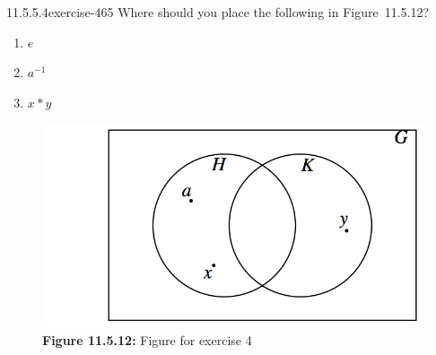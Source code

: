 \documentclass[twoside,10pt,]{book}
\numberwithin{equation}{section}
\begin{document}
\begin{divisionsolution}{11.5.5.4}{}{exercise-465}%
\hypertarget{p-4126}{}%
Where should you place the following in Figure~11.5.12?\leavevmode%
\begin{enumerate}[label=(\alph*)]
\item\hypertarget{li-1874}{}\hypertarget{p-4127}{}%
\(e\)%
\item\hypertarget{li-1875}{}\hypertarget{p-4128}{}%
\(a^{-1}\)%
\item\hypertarget{li-1876}{}\hypertarget{p-4129}{}%
\(x * y\)%
\end{enumerate}
%
\begin{figure}
\centering
\includegraphics[width=0.67\linewidth]{images/fig-venn-subgroups.png}
\caption*{\textbf{Figure 11.5.12:} Figure for exercise 4}
\end{figure}
\end{divisionsolution}%
\end{document}
